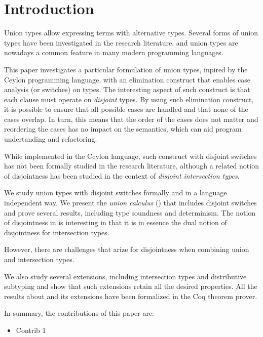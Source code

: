 \section{Introduction}
\label{sec:intro}

Union types allow expressing terms with alternative types. Several forms of
union types have been investigated in the research literature, and
union types are nowadays a common feature in many modern programming
languages.

This paper investigates a particular formulation of union types,
inpired by the Ceylon programming language, with an elimination
construct that enables case analysis (or switches) on types.  The
interesting aspect of such construct is that each clause must operate
on \emph{disjoint} types. By using such elimination construct, it is
possible to ensure that all possible cases are
handled and that none of the cases overlap. In turn, this means that
the order of the cases does not matter and reordering the cases has no
impact on the semantics, which can aid program undertanding and
refactoring.

While implemented in the Ceylon language, such construct
with disjoint switches has not been formally studied in the research
literature, although a related notion of disjointness has been studied
in the context of \emph{disjoint intersection types}.

We study union types
with disjoint switches formally and in a language independent way.
We present the \emph{union calculus} (\cal) that includes disjoint
switches and prove several results, including type soundness and
determinism. The notion of disjointness in \cal is interesting in that
it is in essence the dual notion of disjointness for intersection types. 

However, there are challenges that arize for disjointness when combining
union and intersection types.

We also study several extensions, including intersection
types and distributive subtyping and show that such extensions retain
all the desired properties. All the results about \cal and its
extensions have been formalized in the Coq theorem prover.

In summary, the contributions of this paper are:

\begin{itemize}
\item Contrib 1
\end{itemize}



